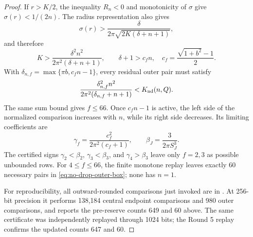 \documentclass[11pt]{article}
\theoremstyle{remark}
\begin{document}
\begin{proof}
If $r>K/2$, the inequality $R_n<0$ and monotonicity of $\sigma$ give
$\sigma(r)<1/(2n)$.  The radius representation also gives
\[
 \sigma(r)>
 \frac{\delta}{2\pi\sqrt{2K(\delta+n+1)}},
\]
and therefore
\begin{equation}
 K>\frac{\delta^2n^2}{2\pi^2(\delta+n+1)},
 \qquad
 \delta+1>c_fn,\quad
 c_f=\frac{\sqrt{1+b^2}-1}{2}.
 \label{eq:no-drop-outer-geometry}
\end{equation}
With $\delta_{n,f}=\max\{\pi b,c_fn-1\}$, every residual outer pair must
satisfy
\begin{equation}
 \frac{\delta_{n,f}^2n^2}
 {2\pi^2(\delta_{n,f}+n+1)}<K_{\rm nd}(n,Q).
 \label{eq:no-drop-outer-obstruction}
\end{equation}
The same sum bound gives $f\leq66$.  Once $c_fn-1$ is active, the left
side of the normalized comparison increases with $n$, while its right side
decreases.  Its limiting coefficients are
\[
 \gamma_f=\frac{c_f^2}{2\pi^2(c_f+1)},
 \qquad \beta_J=\frac3{2\pi S_J^3}.
\]
The certified signs
$\gamma_2<\beta_2$, $\gamma_3<\beta_3$, and
$\gamma_4>\beta_3$ leave only $f=2,3$ as possible unbounded rows.
For $4\leq f\leq66$, the finite monotone replay leaves exactly 60
necessary pairs in \eqref{eq:no-drop-outer-box}; none has $n=1$.

For reproducibility, all outward-rounded comparisons just invoked are in
.  At 256-bit
precision it performs 138,184 central endpoint comparisons and 980 outer
comparisons, and reports the pre-reserve counts 649 and 60 above.  The same
certificate was independently replayed through 1024 bits; the Round 5
replay confirms the updated counts 647 and 60.


\end{proof}
\end{document}
